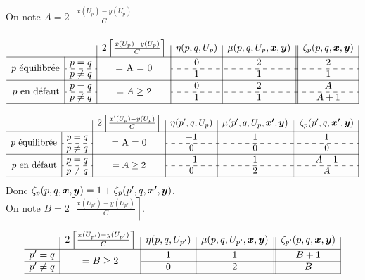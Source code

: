 \documentclass[twoside,11pt,openany,a4paper]{rapport}
\begin{document}
On note $A = 2 \left\lceil \frac{\displaystyle x(U_p)-y(U_p)}{\displaystyle C} \right\rceil$

\begin{gather*}
  \begin{array}{r|c|c|c|c||c|}
    \multicolumn{2}{c|}{}
    & 2 \left\lceil \frac{x(U_p)-y(U_p)}{C} \right\rceil
    & \eta(p,q,U_p)
    & \mu(p,q,U_p,\bs{x},\bs{y})
    & \zeta_p(p,q,\bs{x},\bs{y})
    \\ \hline
    \multirow{2}{*}{$p$ équilibrée}
    & p=q
    & \multirow{2}{*}{= A = 0}
    & 0
    & 2
    & 2
    \\ \cdashline{2-2}\cdashline{4-6}
    & p \ne q
    &
    & 1
    & 1
    & 1
    \\ \hline
    \multirow{2}{*}{$p$ en défaut}
    & p=q
    & \multirow{2}{*}{$= A \ge 2$}
    & 0
    & 2
    & A
    \\ \cdashline{2-2}\cdashline{4-6}
    & p \ne q
    &
    & 1
    & 1
    & A + 1
    \\ \hline
  \end{array}
\end{gather*}

\begin{gather*}
  \begin{array}{r|c|c|c|c||c|}
    \multicolumn{2}{c|}{}
    & 2 \left\lceil \frac{x'(U_p)-y(U_p)}{C} \right\rceil
    & \eta(p',q,U_p)
    & \mu(p',q,U_p,\bs{x'},\bs{y})
    & \zeta_p(p',q,\bs{x'},\bs{y})
    \\ \hline
    \multirow{2}{*}{$p$ équilibrée}
    & p=q
    & \multirow{2}{*}{= A = 0}
    & -1
    & 1
    & 1
    \\ \cdashline{2-2}\cdashline{4-6}
    & p \ne q
    &
    & 0
    & 0
    & 0
    \\ \hline
    \multirow{2}{*}{$p$ en défaut}
    & p=q
    & \multirow{2}{*}{$= A \ge 2$}
    & -1
    & 1
    & A-1
    \\ \cdashline{2-2}\cdashline{4-6}
    & p \ne q
    &
    & 0
    & 2
    & A
    \\ \hline
  \end{array}
\end{gather*}
Donc $\zeta_p(p,q,\boldsymbol{x},\boldsymbol{y}) = 1 + \zeta_p(p',q,\boldsymbol{x'},\boldsymbol{y})$.
\\

On note $B = 2 \left\lceil \frac{\displaystyle x(U_{p'})-y(U_{p'})}{\displaystyle C} \right\rceil$.

\begin{gather*}
  \begin{array}{r|c|c|c||c|}
    & 2 \left\lceil \frac{x(U_{p'})-y(U_{p'})}{C} \right\rceil
    & \eta(p,q,U_{p'})
    & \mu(p,q,U_{p'},\bs{x},\bs{y})
    & \zeta_{p'}(p,q,\bs{x},\bs{y})
    \\ \hline
    p' = q
    & \multirow{2}{*}{$= B \ge 2$}
    & 1
    & 1
    & B + 1
    \\ \cline{1-1}\cline{3-5}
    p' \ne q
    &
    & 0
    & 2
    & B
    \\ \hline
  \end{array}
\end{gather*}
\end{document}
